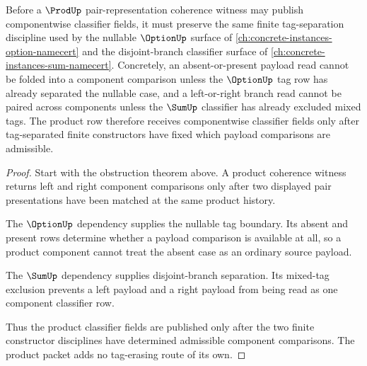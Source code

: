 \begin{theorem}
\label{thm:prod-pair-coherence-finite-tag-separation-route}
Before a $\ProdUp$ pair-representation coherence witness may publish componentwise classifier fields, it must preserve the same finite tag-separation discipline used by the nullable $\OptionUp$ surface of \autoref{ch:concrete-instances-option-namecert} and the disjoint-branch classifier surface of \autoref{ch:concrete-instances-sum-namecert}. Concretely, an absent-or-present payload read cannot be folded into a component comparison unless the $\OptionUp$ tag row has already separated the nullable case, and a left-or-right branch read cannot be paired across components unless the $\SumUp$ classifier has already excluded mixed tags. The product row therefore receives componentwise classifier fields only after tag-separated finite constructors have fixed which payload comparisons are admissible.
\end{theorem}
\begin{proof}
Start with the obstruction theorem above. A product coherence witness returns left and right component comparisons only after two displayed pair presentations have been matched at the same product history.

The $\OptionUp$ dependency supplies the nullable tag boundary. Its absent and present rows determine whether a payload comparison is available at all, so a product component cannot treat the absent case as an ordinary source payload.

The $\SumUp$ dependency supplies disjoint-branch separation. Its mixed-tag exclusion prevents a left payload and a right payload from being read as one component classifier row.

Thus the product classifier fields are published only after the two finite constructor disciplines have determined admissible component comparisons. The product packet adds no tag-erasing route of its own.
\end{proof}

